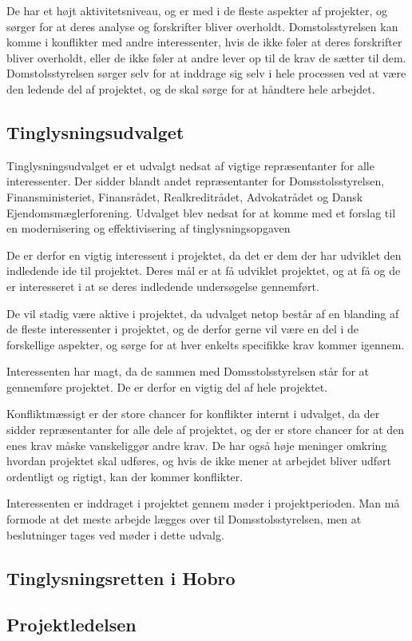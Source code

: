 \documentclass[10pt,a4paper,danish]{article}
\begin{document}
De har et højt aktivitetsniveau, og er med i de fleste aspekter af projekter, og sørger for at deres analyse og forskrifter bliver overholdt. Domstolsstyrelsen kan komme i konflikter med andre interessenter, hvis de ikke føler at deres forskrifter bliver overholdt, eller de ikke føler at andre lever op til de krav de sætter til dem. Domstolsstyrelsen sørger selv for at inddrage sig selv i hele processen ved at være den ledende del af projektet, og de skal sørge for at håndtere hele arbejdet.


\subsection{Tinglysningsudvalget}

Tinglysningsudvalget er et udvalgt nedsat af vigtige repræsentanter for alle interessenter. Der sidder blandt andet repræsentanter for Domsstolsstyrelsen, Finansministeriet, Finansrådet, Realkreditrådet, Advokatrådet og Dansk Ejendomsmæglerforening. Udvalget blev nedsat for at komme med et forslag til en modernisering og effektivisering af tinglysningsopgaven

De er derfor en vigtig interessent i projektet, da det er dem der har udviklet den indledende ide til projektet. Deres mål er at få udviklet projektet, og at få og de er interesseret i at se deres indledende undersøgelse gennemført.

De vil stadig være aktive i projektet, da udvalget netop består af en blanding af de fleste interessenter i projektet, og de derfor gerne vil være en del i de forskellige aspekter, og sørge for at hver enkelts specifikke krav kommer igennem.

Interessenten har magt, da de sammen med Domsstolsstyrelsen står for at gennemføre projektet. De er derfor en vigtig del af hele projektet. 

Konfliktmæssigt er der store chancer for konflikter internt i udvalget, da der sidder repræsentanter for alle dele af projektet, og der er store chancer for at den enes krav måske vanskeliggør andre krav. De har også høje meninger omkring hvordan projektet skal udføres, og hvis de ikke mener at arbejdet bliver udført ordentligt og rigtigt, kan der kommer konflikter.

Interessenten er inddraget i projektet gennem møder i projektperioden. Man må formode at det meste arbejde lægges over til Domsstolsstyrelsen, men at beslutninger tages ved møder i dette udvalg.

\subsection{Tinglysningsretten i Hobro}


\subsection{Projektledelsen}
\end{document}
